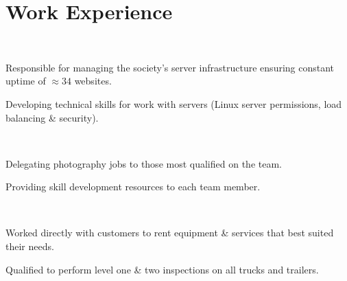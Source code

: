 \documentclass[]{hieudo-build}
\begin{document}
\begin{minipage}[t]{0.65\textwidth}
\section{Work Experience}

\\
\begin{tightemize}
\item Responsible for managing the society's server infrastructure ensuring constant uptime of $\approx 34$ websites.
\item Developing technical skills for work with servers (Linux server permissions, load balancing \& security).
\end{tightemize}
\sectionsep

 \\
\begin{tightemize}
\item Delegating photography jobs to those most qualified on the team.
\item Providing skill development resources to each team member.
\end{tightemize}
\sectionsep

 \\
\begin{tightemize}
\item Worked directly with customers to rent equipment \& services that best suited their needs.
\item Qualified to perform level one \& two inspections on all trucks and trailers.
\end{tightemize}
\sectionsep



\end{minipage}
\end{document}
